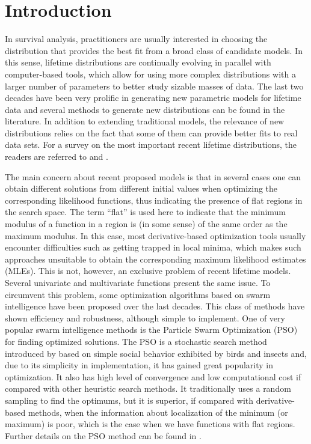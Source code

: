 \documentclass[10pt,letterpaper]{article}
\begin{document}
\linenumbers

\section{Introduction}

In survival analysis, practitioners are usually interested in choosing the distribution that provides the best fit from a broad class of candidate models. In this sense, lifetime distributions are continually evolving in parallel with computer-based tools, which allow for using more complex distributions
with a larger number of parameters to better study sizable masses of data. The last two decades have been very prolific in generating new parametric models for lifetime data and several methods to generate new distributions can be found in the literature. In addition to extending traditional models, the relevance of new distributions relies on the fact that some of them can provide better fits to real data sets. For a survey on the most important recent lifetime distributions, the readers are referred to \cite{almalkinadarajah2014} and \cite{tahircordeiro2016}.

The main concern about recent proposed models is that in several cases one can obtain different solutions from different initial values when optimizing the corresponding likelihood functions, thus indicating the presence of flat regions in the search space. The term ``flat'' is used here to indicate that the minimum modulus of a function in a region is (in some sense) of the same order as the maximum modulus. In this case, most derivative-based optimization tools usually encounter difficulties such as getting trapped in local minima, which makes such approaches unsuitable to obtain the corresponding maximum likelihood estimates (MLEs). This is not, however, an exclusive problem of recent lifetime models. Several univa\-ria\-te and multivariate functions present the same issue. To circumvent this problem, some optimization algorithms based on swarm intelligence have been proposed over the last decades. This class of methods have shown efficiency and robustness, although simple to implement. One of very popular swarm intelligence methods is the Particle Swarm Optimization (PSO) for finding optimized solutions. The PSO is a stochastic search method introduced by \cite{kennedyeberhart1995} based on simple social behavior exhibited by birds and insects and, due to its simplicity in implementation, it has gained great popularity in optimization. It also has high level of convergence and low computational cost if compared with other heuristic search methods. It traditionally uses a random sampling to find the optimums, but it is
superior, if compared with derivative-based methods, when the information about localization of the minimum (or maximum) is poor, which is the case when we have functions with flat regions. Further details on the PSO method can be found in \cite{kennedyetal2001}.
\end{document}
